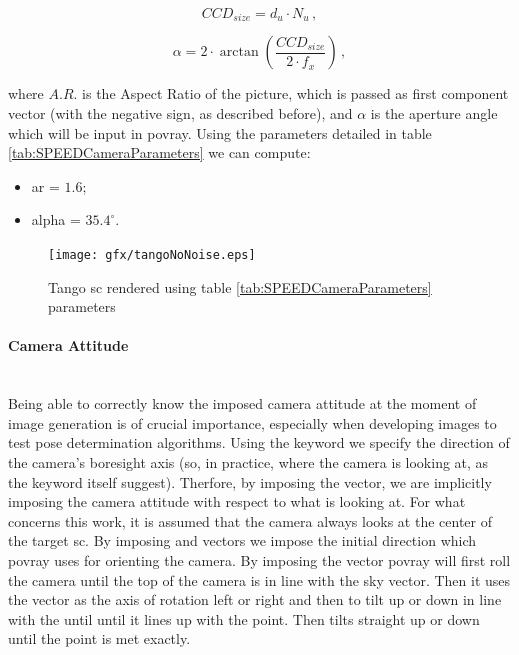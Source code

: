 \begin{equation}
  CCD_{size} = d_u \cdot N_u \,,
\end{equation}

\begin{equation}
  \alpha = 2 \cdot \arctan{\left( \frac{CCD_{size}}{2 \cdot f_x} \right)} \,,
\end{equation}

where $A.R.$ is the Aspect Ratio of the picture, which is passed as first component  vector (with the negative sign, as described before), and $\alpha$ is the aperture angle which will be input in \acrshort{povray}.
Using the parameters detailed in table \ref{tab:SPEEDCameraParameters} we can compute:
\begin{itemize}
  \item \gls{ar} = $1.6$;
  \item \gls{alpha} = $35.4 ^{\circ}$.
\end{itemize}

\begin{figure}[htbp]
  \centering
  \texttt{[image: gfx/tangoNoNoise.eps]}
  \caption{Tango \acrshort{sc} rendered using table \ref{tab:SPEEDCameraParameters} parameters}
  \label{fig:tangoNoNoise}
\end{figure}

\paragraph{Camera Attitude}\mbox{}\\
Being able to correctly know the imposed camera attitude at the moment of image generation is of crucial importance, especially when developing images to test pose determination algorithms.
Using the  keyword we specify the direction of the camera's boresight axis (so, in practice, where the camera is looking at, as the keyword itself suggest). Therfore, by imposing the  vector, we are implicitly imposing the camera attitude with respect to what is looking at. For what concerns this work, it is assumed that the camera always looks at the center of the target \acrshort{sc}.
By imposing  and  vectors we impose the initial direction which \acrshort{povray} uses for orienting the camera.
By imposing the  vector \acrshort{povray} will first roll the camera until the top of the camera is in line with the sky vector. Then it uses the  vector as the axis of rotation left or right and then to tilt up or down in line with the  until until it lines up with the  point. Then tilts straight up or down until the  point is met exactly.

